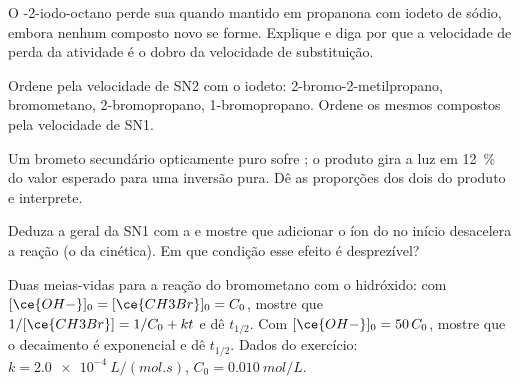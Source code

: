 \begin{exercise}[$\star\star$]\label{exo:b1:nucleophilic-substitution:7}
O -2-iodo-octano perde sua  quando mantido em
propanona com iodeto de sódio, embora nenhum composto novo se forme.
Explique e diga por que a velocidade de perda da atividade é o dobro da
velocidade de substituição.
\end{exercise}

\begin{exercise}[$\star\star$]\label{exo:b1:nucleophilic-substitution:8}
Ordene pela velocidade de SN2 com o iodeto: 2-bromo-2-metilpropano,
bromometano, 2-bromopropano, 1-bromopropano. Ordene os mesmos compostos
pela velocidade de  SN1.
\end{exercise}

\begin{exercise}[$\star\star$]\label{exo:b1:nucleophilic-substitution:9}
Um brometo secundário opticamente puro sofre ; o produto gira a
luz em \qty{12}{\percent} do valor esperado para uma inversão pura. Dê as
proporções dos dois  do produto e interprete.
\end{exercise}

\begin{exercise}[$\star\star\star$]\label{exo:b1:nucleophilic-substitution:10}
Deduza a  geral da SN1 com a  e mostre que adicionar o íon do   no
início desacelera a reação (o  da cinética). Em que
condição esse efeito é desprezível?
\end{exercise}

\begin{exercise}[$\star\star\star$]\label{exo:b1:nucleophilic-substitution:11}
Duas meias-vidas para a reação do bromometano com o hidróxido: com
$[\ce{OH-}]_0 = [\ce{CH3Br}]_0 = C_0$, mostre que $1/[\ce{CH3Br}] = 1/C_0 +
kt$ e dê $t_{1/2}$. Com $[\ce{OH-}]_0 = 50\,C_0$, mostre que o
decaimento é exponencial e dê $t_{1/2}$. Dados do exercício: $k =
\qty{2.0e-4}{L/(mol.s)}$, $C_0 = \qty{0.010}{mol/L}$.
\end{exercise}


